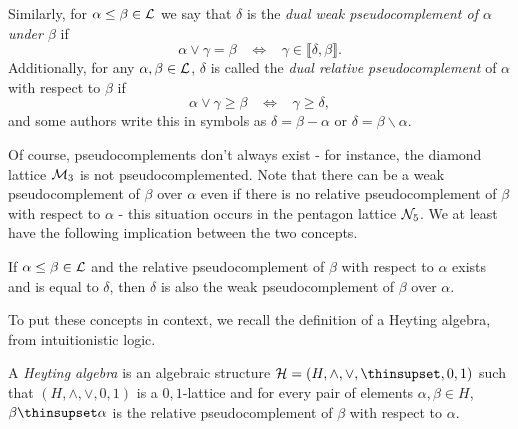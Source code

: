 \begin{appendices}
\begin{defn}
Similarly, for $\alpha \le \beta \in \mathcal{L}$ we say that $\delta$ is the \emph{dual weak pseudocomplement of $\alpha$ under $\beta$} if
\[
\alpha \vee \gamma = \beta \;\;\; \iff \;\;\; \gamma \in \llbracket \delta, \beta \rrbracket.
\]
Additionally, for any $\alpha, \beta \in \mathcal{L}$, $\delta$ is called the \emph{dual relative pseudocomplement} of $\alpha$ with respect to $\beta$ if
\[
\alpha \vee \gamma \ge \beta \;\;\; \iff \;\;\; \gamma \ge \delta,
\]
and some authors write this in symbols as $\delta = \beta - \alpha$ or $\delta = \beta \backslash \alpha$.
\end{defn}

Of course, pseudocomplements don't always exist - for instance, the diamond lattice $\mathcal{M}_3$ is not pseudocomplemented. Note that there can be a weak pseudocomplement of $\beta$ over $\alpha$ even if there is no relative pseudocomplement of $\beta$ with respect to $\alpha$ - this situation occurs in the pentagon lattice $\mathcal{N}_5$. We at least have the following implication between the two concepts.

\begin{prop} If $\alpha \le \beta \in \mathcal{L}$ and the relative pseudocomplement of $\beta$ with respect to $\alpha$ exists and is equal to $\delta$, then $\delta$ is also the weak pseudocomplement of $\beta$ over $\alpha$.
\end{prop}

To put these concepts in context, we recall the definition of a Heyting algebra, from intuitionistic logic.

\begin{defn} A \emph{Heyting algebra} is an algebraic structure $\cH = (H, \wedge, \vee, \thinsupset, 0, 1)$ such that $(H, \wedge, \vee, 0, 1)$ is a $0,1$-lattice and for every pair of elements $\alpha, \beta \in H$, $\beta \thinsupset \alpha$ is the relative pseudocomplement of $\beta$ with respect to $\alpha$.
\end{defn}


\end{appendices}
